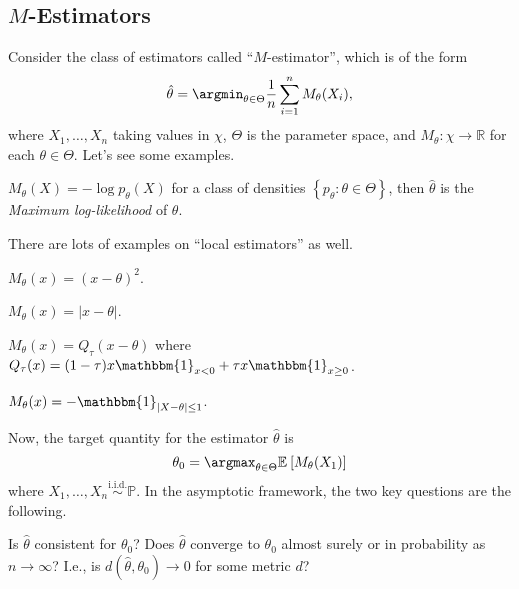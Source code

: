 \subsection{\(M\)-Estimators}\label{subsec:M-estimators}
Consider the class of estimators called ``\(M\)-estimator'', which is of the form
\[
	\hat{\theta} = \argmin_{\theta \in \Theta } \frac{1}{n} \sum_{i=1}^{n} M_\theta (X_i),
\]
where \(X_1, \dots , X_n \) taking values in \(\chi \), \(\Theta \) is the parameter space, and \(M_\theta \colon \chi \to \mathbb{R} \) for each \(\theta \in \Theta \). Let's see some examples.

\begin{eg}
	\(M_\theta (X) = - \log p_\theta (X)\) for a class of densities \(\left\{ p_\theta \colon \theta \in \Theta  \right\} \), then \(\hat{\theta} \) is the \emph{Maximum log-likelihood} of \(\theta \).
\end{eg}

There are lots of examples on ``local estimators'' as well.

\begin{eg}[Mean]
	\(M_\theta (x) = (x-\theta )^2\).
\end{eg}

\begin{eg}[Median]
	\(M_\theta (x) = \vert x - \theta  \vert\).
\end{eg}

\begin{eg}
	\(M_\theta (x) = Q_{\tau } (x - \theta )\) where \(Q_\tau (x) = (1 - \tau ) x \mathbbm{1}_{x < 0} + \tau x \mathbbm{1}_{x\geq 0} \).
\end{eg}

\begin{eg}[Mode]
	\(M_\theta (x) = - \mathbbm{1}_{\vert X - \theta  \vert \leq 1}\).
\end{eg}

Now, the target quantity for the estimator \(\hat{\theta} \) is
\[
	\theta _0 = \argmax_{\theta \in \Theta } \mathbb{E}_{}\left[M_\theta (X_1) \right]
\]
where \(X_1, \dots , X_n \overset{\text{i.i.d.} }{\sim }\mathbb{P} \). In the asymptotic framework, the two key questions are the following.

\begin{problem*}
	Is \(\hat{\theta} \) consistent for \(\theta _0\)? Does \(\hat{\theta} \) converge to \(\theta _0\) almost surely or in probability as \(n\to \infty \)? I.e., is \(d(\hat{\theta} , \theta _0)\to 0\) for some metric \(d\)?
\end{problem*}

